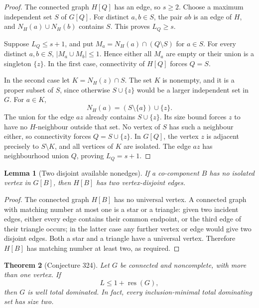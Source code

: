 \documentclass[11pt,a4paper]{article}
\newtheorem{theorem}{Theorem}[section]
\newtheorem{lemma}[theorem]{Lemma}
\theoremstyle{remark}
\begin{document}
\begin{proof}
The connected graph $H[Q]$ has an edge, so $s\ge2$.
Choose a maximum independent set $S$ of $G[Q]$.  For distinct
$a,b\in S$, the pair $ab$ is an edge of $H$, and
$N_H(a)\cup N_H(b)$ contains $S$.  This proves $L_Q\ge s$.

Suppose $L_Q\le s+1$, and put
$M_a=N_H(a)\cap(Q\setminus S)$ for $a\in S$.
For every distinct $a,b\in S$,
$|M_a\cup M_b|\le1$.  Hence either all $M_a$ are empty or their
union is a singleton $\{z\}$.  In the first case, connectivity of
$H[Q]$ forces $Q=S$.

In the second case let $K=N_H(z)\cap S$.  The set $K$ is nonempty,
and it is a proper subset of $S$, since otherwise $S\cup\{z\}$
would be a larger independent set in $G$.  For $a\in K$,
\[
 N_H(a)=(S\setminus\{a\})\cup\{z\}.
\]
The union for the edge $az$ already contains $S\cup\{z\}$.
Its size bound forces $z$ to have no $H$-neighbour outside that
set.  No vertex of $S$ has such a neighbour either, so connectivity
forces $Q=S\cup\{z\}$.  In $G[Q]$, the vertex $z$ is adjacent
precisely to $S\setminus K$, and all vertices of $K$ are isolated.
The edge $az$ has neighbourhood union $Q$, proving $L_Q=s+1$.
\end{proof}

\begin{lemma}[Two disjoint available nonedges]
\label{r7:324-supply}
If a co-component $B$ has no isolated vertex in $G[B]$, then $H[B]$
has two vertex-disjoint edges.
\end{lemma}

\begin{proof}
The connected graph $H[B]$ has no universal vertex.  A connected
graph with matching number at most one is a star or a triangle:
given two incident edges, either every edge contains their common
endpoint, or the third edge of their triangle occurs; in the latter
case any further vertex or edge would give two disjoint edges.
Both a star and a triangle have a universal vertex.  Therefore
$H[B]$ has matching number at least two, as required.
\end{proof}

\begin{theorem}[Conjecture 324]
\label{r7:324-theorem}
Let $G$ be connected and noncomplete, with more than one vertex.
If
\begin{equation}
 L\le1+\operatorname{res}(G),
 \label{r7:324-premise}
\end{equation}
then $G$ is well total dominated.  In fact, every inclusion-minimal
total dominating set has size two.
\end{theorem}
\end{document}
